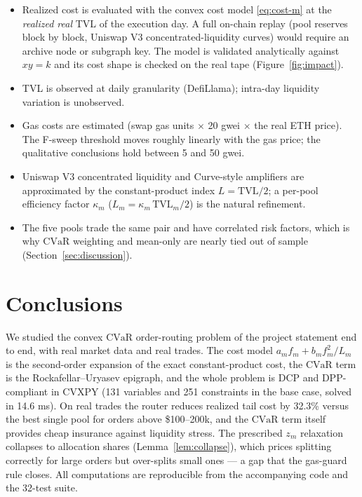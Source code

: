 \documentclass[11pt,a4paper]{article}
\theoremstyle{remark}
\newcommand{\cvar}{\texorpdfstring{\ensuremath{\mathrm{CVaR}}}{CVaR}}
\begin{document}
\begin{itemize}[leftmargin=2.2em]
  \item Realized cost is evaluated with the convex cost model \eqref{eq:cost-m} at the
        \emph{realized real} TVL of the execution day.  A full on-chain replay (pool
        reserves block by block, Uniswap V3 concentrated-liquidity curves) would require an
        archive node or subgraph key.  The model is validated analytically against $xy=k$
        and its cost shape is checked on the real tape (Figure~\ref{fig:impact}).
  \item TVL is observed at daily granularity (DefiLlama); intra-day liquidity variation is
        unobserved.
  \item Gas costs are estimated (swap gas units $\times$ 20 gwei $\times$ the real ETH
        price).  The F-sweep threshold moves roughly linearly with the gas price; the
        qualitative conclusions hold between 5 and 50 gwei.
  \item Uniswap V3 concentrated liquidity and Curve-style amplifiers are approximated by the
        constant-product index $L=\mathrm{TVL}/2$; a per-pool efficiency factor $\kappa_m$
        ($L_m=\kappa_m\,\mathrm{TVL}_m/2$) is the natural refinement.
  \item The five pools trade the same pair and have correlated risk factors, which is why
        \cvar{} weighting and mean-only are nearly tied out of sample
        (Section~\ref{sec:discussion}).
\end{itemize}

\section{Conclusions}

We studied the convex \cvar{} order-routing problem of the project statement end to end,
with real market data and real trades.  The cost model $a_m f_m + b_m f_m^2/L_m$ is the
second-order expansion of the exact constant-product cost, the \cvar{} term is the
Rockafellar--Uryasev epigraph, and the whole problem is DCP and DPP-compliant in CVXPY
(131 variables and 251 constraints in the base case, solved in 14.6 ms).  On real trades the
router reduces realized tail cost by 32.3\% versus the best single pool for orders above
\$100--200k, and the \cvar{} term itself provides cheap insurance against liquidity stress.
The prescribed $z_m$ relaxation collapses to allocation shares (Lemma~\ref{lem:collapse}),
which prices splitting correctly for large orders but over-splits small ones --- a gap that
the gas-guard rule closes.  All computations are reproducible from the accompanying code
and the 32-test suite.
\end{document}
